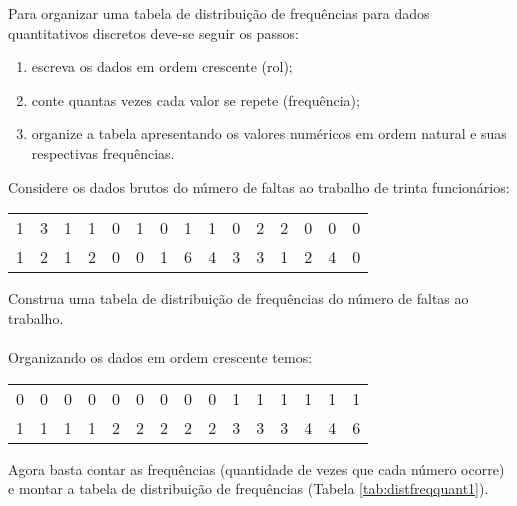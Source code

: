 \documentclass[11pt,fleqn]{book} %
\begin{document}
Para organizar uma tabela de distribuição de frequências para dados quantitativos discretos deve-se seguir os passos:

\begin{enumerate}
\item escreva os dados em ordem crescente (rol);
\item conte quantas vezes cada valor se repete (frequência);
\item organize a tabela apresentando os valores numéricos em ordem natural e suas respectivas frequências. \\
\end{enumerate}

\begin{example} \label{exemp:tabFreqQuanti}
	Considere os dados brutos do número de faltas ao trabalho de trinta funcionários:
	
	\begin{center}
	\begin{tabular}{c c c c c c c c c c c c c c c}
	\hline
	1 & 3 & 1 & 1 & 0 & 1 & 0 & 1 & 1 & 0 & 2 & 2 & 0 & 0 & 0 \\
	1 & 2 & 1 & 2 & 0 & 0 & 1 & 6 & 4 & 3 & 3 & 1 & 2 & 4 & 0 \\
	\hline
	\end{tabular}
	\end{center}
	
	Construa uma tabela de distribuição de frequências do número de faltas ao trabalho. \\
	
	\noindent \hspace{0.3cm}{\small\bf\sffamily Solução} \\
	
	Organizando os dados em ordem crescente temos:
	
	\begin{center}
	\begin{tabular}{c c c c c c c c c c c c c c c}
	\hline
	0 & 0 & 0 & 0 & 0 & 0 & 0 & 0 & 0 &  1 &  1 &  1 &  1 &  1 &  1 \\
	1 & 1 & 1 & 1 & 2 & 2 & 2 & 2 & 2 &  3 &  3 &  3 &  4 &  4 &  6 \\
	\hline
	\end{tabular}
	\end{center}
	
	Agora basta contar as frequências (quantidade de vezes que cada número ocorre) e montar a tabela de 
	distribuição de frequências (Tabela \ref{tab:distfreqquant1}). \\
	

\end{example}
\end{document}
